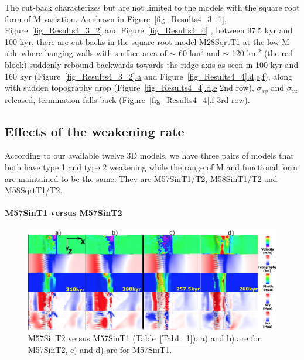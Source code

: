 The cut-back characterizes but are not limited to the models with the square root form of M variation. As shown in Figure~\hyperref[fig_Results4_3_1]{\ref{fig_Results4_3_1}}, Figure~\hyperref[fig_Results4_3_1]{\ref{fig_Results4_3_2}} and Figure~\hyperref[fig_Results4_4]{\ref{fig_Results4_4}} , between 97.5 kyr and 100 kyr, there are cut-backs in the square root model M28SqrtT1 at the low M side where hanging walls with surface area of $\sim$ 60 km$^{2}$ and $\sim$ 120 km$^{2}$ (the red block) suddenly rebound backwards towards the ridge axis as seen in 100 kyr and 160 kyr (Figure~\hyperref[fig_Results4_3_1]{\ref{fig_Results4_3_2}.a} and Figure~\hyperref[fig_Results4_4]{\ref{fig_Results4_4}.d,e,f}), along with sudden topography drop (Figure~\hyperref[fig_Results4_4]{\ref{fig_Results4_4}.d,e} 2nd row), $\sigma_{xy}$ and $\sigma_{xz}$ released, termination falls back (Figure~\hyperref[fig_Results4_4]{\ref{fig_Results4_4}.f} 3rd row). 

\subsection{Effects of the weakening rate}

According to our available twelve 3D models, we have three pairs of models that both have type 1 and type 2  weakening while the range of M and functional form are maintained to be the same. They are M57SinT1/T2, M58SinT1/T2 and M58SqrtT1/T2.

\paragraph{M57SinT1 versus M57SinT2}

\begin{figure}[h]
 \centering
  \includegraphics[width=1.0\textwidth]{./Figures/fig_Results_Weakening_2_M57SinT1VST2_CutbackVSsecondaryFault.eps}
 \caption{M57SinT2 versus M57SinT1 (Table~\hyperref[Tab1_1]{\ref{Tab1_1}}). a) and b) are for M57SinT2, c) and d) are for M57SinT1.}
\label{fig_Results_Weakenging_2}
\end{figure}

